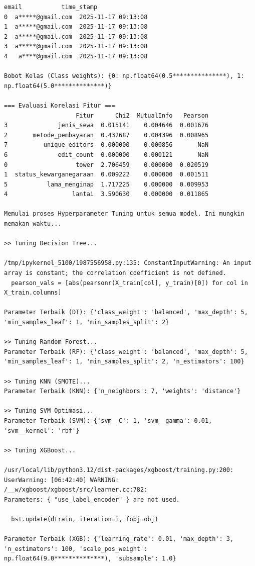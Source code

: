 \begin{lstlisting}[caption={Output 2}]
              email           time_stamp  
0  a*****@gmail.com  2025-11-17 09:13:08  
1  a*****@gmail.com  2025-11-17 09:13:08  
2  a*****@gmail.com  2025-11-17 09:13:08  
3  a*****@gmail.com  2025-11-17 09:13:08  
4   a****@gmail.com  2025-11-17 09:13:08  

Bobot Kelas (Class weights): {0: np.float64(0.5***************), 1: np.float64(5.0**************)}

=== Evaluasi Korelasi Fitur ===
                    Fitur      Chi2  MutualInfo   Pearson
3              jenis_sewa  0.015141    0.004646  0.001676
2       metode_pembayaran  0.432687    0.004396  0.008965
7          unique_editors  0.000000    0.000856       NaN
6              edit_count  0.000000    0.000121       NaN
0                   tower  2.706459    0.000000  0.020519
1  status_kewarganegaraan  0.009222    0.000000  0.001511
5           lama_menginap  1.717225    0.000000  0.009953
4                  lantai  3.590630    0.000000  0.011865

Memulai proses Hyperparameter Tuning untuk semua model. Ini mungkin memakan waktu...

>> Tuning Decision Tree...

/tmp/ipykernel_5100/1987556958.py:135: ConstantInputWarning: An input array is constant; the correlation coefficient is not defined.
  pearson_vals = [abs(pearsonr(X_train[col], y_train)[0]) for col in X_train.columns]

Parameter Terbaik (DT): {'class_weight': 'balanced', 'max_depth': 5, 'min_samples_leaf': 1, 'min_samples_split': 2}

>> Tuning Random Forest...
Parameter Terbaik (RF): {'class_weight': 'balanced', 'max_depth': 5, 'min_samples_leaf': 1, 'min_samples_split': 2, 'n_estimators': 100}

>> Tuning KNN (SMOTE)...
Parameter Terbaik (KNN): {'n_neighbors': 7, 'weights': 'distance'}

>> Tuning SVM Optimasi...
Parameter Terbaik (SVM): {'svm__C': 1, 'svm__gamma': 0.01, 'svm__kernel': 'rbf'}

>> Tuning XGBoost...

/usr/local/lib/python3.12/dist-packages/xgboost/training.py:200: UserWarning: [06:42:40] WARNING: /__w/xgboost/xgboost/src/learner.cc:782: 
Parameters: { "use_label_encoder" } are not used.

  bst.update(dtrain, iteration=i, fobj=obj)

Parameter Terbaik (XGB): {'learning_rate': 0.01, 'max_depth': 3, 'n_estimators': 100, 'scale_pos_weight': np.float64(9.0**************), 'subsample': 1.0}


\end{lstlisting}
